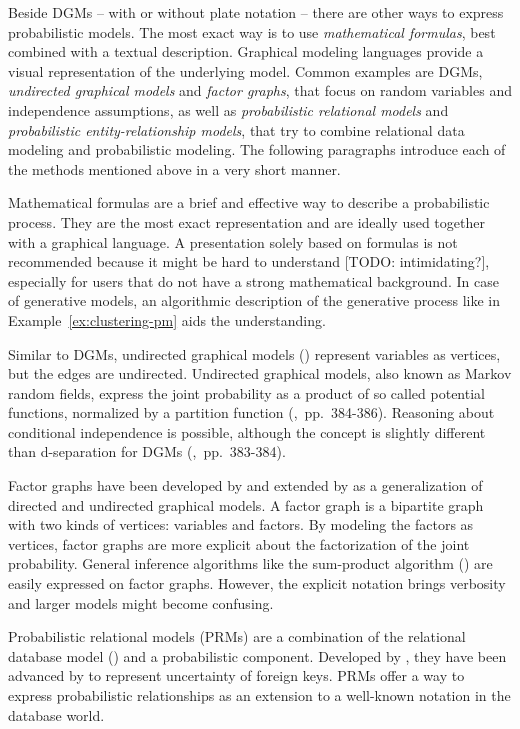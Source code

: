 Beside DGMs -- with or without plate notation -- there are other ways to express probabilistic models. The most exact way is to use \emph{mathematical formulas}, best combined with a textual description. Graphical modeling languages provide a visual representation of the underlying model. Common examples are DGMs, \emph{undirected graphical models} and \emph{factor graphs}, that focus on random variables and independence assumptions, as well as \emph{probabilistic relational models} and \emph{probabilistic entity-relationship models}, that try to combine relational data modeling and probabilistic modeling. The following paragraphs introduce each of the methods mentioned above in a very short manner.

Mathematical formulas are a brief and effective way to describe a probabilistic process. They are the most exact representation and are ideally used together with a graphical language. A presentation solely based on formulas is not recommended because it might be hard to understand [TODO: intimidating?], especially for users that do not have a strong mathematical background. In case of generative models, an algorithmic description of the generative process like in Example~\ref{ex:clustering-pm} aids the understanding. 

Similar to DGMs, undirected graphical models (\cite{kindermann1980markov}) represent variables as vertices, but the edges are undirected. Undirected graphical models, also known as Markov random fields, express the joint probability as a product of so called potential functions, normalized by a partition function (\cite{bishop2006pattern},~pp.~384-386). Reasoning about conditional independence is possible, although the concept is slightly different than d-separation for DGMs (\cite{bishop2006pattern},~pp.~383-384).

Factor graphs have been developed by \textcite{kschischang2001factor} and extended by \textcite{frey2002extending} as a generalization of directed and undirected graphical models. A factor graph is a bipartite graph with two kinds of vertices: variables and factors. By modeling the factors as vertices, factor graphs are more explicit about the factorization of the joint probability. General inference algorithms like the sum-product algorithm (\cite{pearl1988probabilistic}) are easily expressed on factor graphs. However, the explicit notation brings verbosity and larger models might become confusing.

Probabilistic relational models (PRMs) are a combination of the relational database model (\cite{codd1970relational}) and a probabilistic component. Developed by \textcite{friedman1999learning}, they have been advanced by \textcite{getoor2003learning} to represent uncertainty of foreign keys. PRMs offer a way to express probabilistic relationships as an extension to a well-known notation in the database world.

